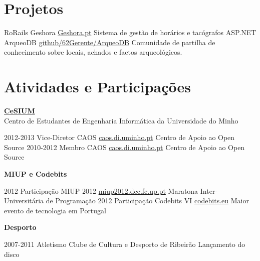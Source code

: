 \documentclass[]{friggeri-cv}
\begin{document}
\section{Projetos}

\begin{entrylist}
  \entry
    {RoRails}
    {Geshora}
    {\href{http://geshora.pt}{Geshora.pt}} 
    {Sistema de gestão de horários e tacógrafos}
  \entry
    {ASP.NET}
    {ArqueoDB}
    {\href{https://github.com/62Gerente/ArqueoDB}{github/62Gerente/ArqueoDB}} 
    {Comunidade de partilha de conhecimento sobre locais, achados e factos arqueológicos.}
\end{entrylist}

\section{Atividades e Participações}

\textbf{\Large \href{http://www.cesium.di.uminho.pt/}{CeSIUM}} 
\\Centro de Estudantes de Engenharia Informática da Universidade do Minho

\begin{entrylist}
  \entry
    {2012-2013}
    {Vice-Diretor CAOS}
    {\href{http://caos.di.uminho.pt/}{caos.di.uminho.pt}} 
    {Centro de Apoio ao Open Source}
  \entry
    {2010-2012}
    {Membro CAOS}
    {\href{http://caos.di.uminho.pt/}{caos.di.uminho.pt}} 
    {Centro de Apoio ao Open Source}
\end{entrylist}

\textbf{\Large MIUP e Codebits} 

\begin{entrylist}
  \entry
    {2012}
    {Participação MIUP 2012}
    {\href{http://miup2012.dcc.fc.up.pt/}{miup2012.dcc.fc.up.pt}} 
    {Maratona Inter-Universitária de Programação}
  \entry
    {2012}
    {Participação Codebits VI}
    {\href{https://codebits.eu/}{codebits.eu}} 
    {Maior evento de tecnologia em Portugal}
\end{entrylist}

\textbf{\Large Desporto} 

\begin{entrylist}
  \entry
    {2007-2011}
    {Atletismo}
    {Clube de Cultura e Desporto de Ribeirão} 
    {Lançamento do disco}
\end{entrylist}
\end{document}
